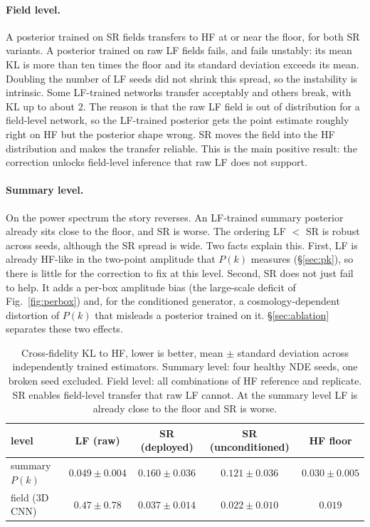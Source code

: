 \documentclass{article} %
\begin{document}
\paragraph{Field level.} A posterior trained on SR fields transfers to HF at or
near the floor, for both SR variants. A posterior trained on raw LF fields fails,
and fails unstably: its mean KL is more than ten times the floor and its standard
deviation exceeds its mean. Doubling the number of LF seeds did not shrink this
spread, so the instability is intrinsic. Some LF-trained networks transfer
acceptably and others break, with KL up to about $2$. The reason is that the raw LF
field is out of distribution for a field-level network, so the LF-trained posterior
gets the point estimate roughly right on HF but the posterior shape wrong. SR moves
the field into the HF distribution and makes the transfer reliable. This is the
main positive result: the correction unlocks field-level inference that raw LF does
not support.

\paragraph{Summary level.} On the power spectrum the story reverses. An LF-trained
summary posterior already sits close to the floor, and SR is worse. The ordering
LF $<$ SR is robust across seeds, although the SR spread is wide. Two facts explain
this. First, LF is already HF-like in the two-point amplitude that $P(k)$ measures
(\S\ref{sec:pk}), so there is little for the correction to fix at this level.
Second, SR does not just fail to help. It adds a per-box amplitude bias (the
large-scale deficit of Fig.~\ref{fig:perbox}) and, for the conditioned generator, a
cosmology-dependent distortion of $P(k)$ that misleads a posterior trained on it.
\S\ref{sec:ablation} separates these two effects.

\begin{table}[t]
\centering
\caption{Cross-fidelity KL to HF, lower is better, mean $\pm$ standard deviation
across independently trained estimators. Summary level: four healthy NDE seeds,
one broken seed excluded. Field level: all combinations of HF reference and
replicate. SR enables field-level transfer that raw LF cannot. At the summary level
LF is already close to the floor and SR is worse.}
\label{tab:crossfid}
\begin{tabular}{lcccc}
\toprule
level & LF (raw) & SR (deployed) & SR (unconditioned) & HF floor \\
\midrule
summary $P(k)$ & $\mathbf{0.049\pm0.004}$ & $0.160\pm0.036$ & $0.121\pm0.036$ & $0.030\pm0.005$ \\
field (3D CNN) & $0.47\pm0.78$ & $\mathbf{0.037\pm0.014}$ & $\mathbf{0.022\pm0.010}$ & $0.019$ \\
\bottomrule
\end{tabular}
\end{table}
\end{document}
